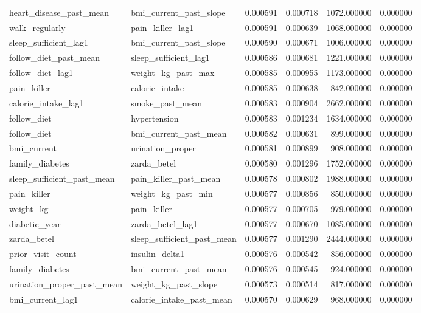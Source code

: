 \begin{longtable}{llrrrr}
heart\_disease\_past\_mean & bmi\_current\_past\_slope & 0.000591 & 0.000718 & 1072.000000 & 0.000000 \\
walk\_regularly & pain\_killer\_lag1 & 0.000591 & 0.000639 & 1068.000000 & 0.000000 \\
sleep\_sufficient\_lag1 & bmi\_current\_past\_slope & 0.000590 & 0.000671 & 1006.000000 & 0.000000 \\
follow\_diet\_past\_mean & sleep\_sufficient\_lag1 & 0.000586 & 0.000681 & 1221.000000 & 0.000000 \\
follow\_diet\_lag1 & weight\_kg\_past\_max & 0.000585 & 0.000955 & 1173.000000 & 0.000000 \\
pain\_killer & calorie\_intake & 0.000585 & 0.000638 & 842.000000 & 0.000000 \\
calorie\_intake\_lag1 & smoke\_past\_mean & 0.000583 & 0.000904 & 2662.000000 & 0.000000 \\
follow\_diet & hypertension & 0.000583 & 0.001234 & 1634.000000 & 0.000000 \\
follow\_diet & bmi\_current\_past\_mean & 0.000582 & 0.000631 & 899.000000 & 0.000000 \\
bmi\_current & urination\_proper & 0.000581 & 0.000899 & 908.000000 & 0.000000 \\
family\_diabetes & zarda\_betel & 0.000580 & 0.001296 & 1752.000000 & 0.000000 \\
sleep\_sufficient\_past\_mean & pain\_killer\_past\_mean & 0.000578 & 0.000802 & 1988.000000 & 0.000000 \\
pain\_killer & weight\_kg\_past\_min & 0.000577 & 0.000856 & 850.000000 & 0.000000 \\
weight\_kg & pain\_killer & 0.000577 & 0.000705 & 979.000000 & 0.000000 \\
diabetic\_year & zarda\_betel\_lag1 & 0.000577 & 0.000670 & 1085.000000 & 0.000000 \\
zarda\_betel & sleep\_sufficient\_past\_mean & 0.000577 & 0.001290 & 2444.000000 & 0.000000 \\
prior\_visit\_count & insulin\_delta1 & 0.000576 & 0.000542 & 856.000000 & 0.000000 \\
family\_diabetes & bmi\_current\_past\_mean & 0.000576 & 0.000545 & 924.000000 & 0.000000 \\
urination\_proper\_past\_mean & weight\_kg\_past\_slope & 0.000573 & 0.000514 & 817.000000 & 0.000000 \\
bmi\_current\_lag1 & calorie\_intake\_past\_mean & 0.000570 & 0.000629 & 968.000000 & 0.000000 \\

\end{longtable}
